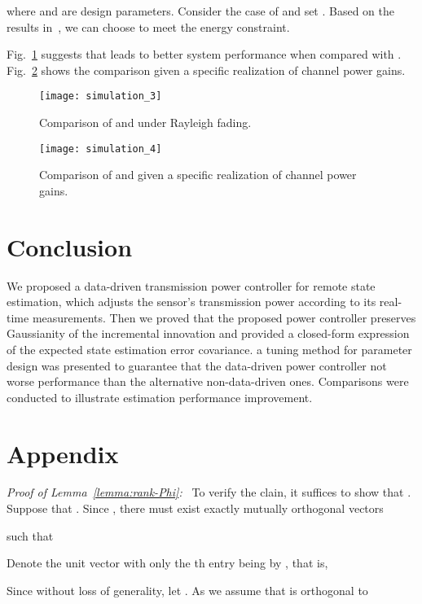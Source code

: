 \documentclass[twocolumn]{autart}    \usepackage{cite}
\begin{document}
{where  and  are design parameters.
Consider the case of  and set . Based on the results in~\cite{leong2012power}, we can choose  to meet the energy constraint.
{Fig.~\ref{fig:simulation_3} suggests that  leads
to better system performance when compared with . Fig.~\ref{fig:simulation_4}
shows the comparison given a specific realization of channel power gains.
\begin{figure}[thp]
  \centering
  \texttt{[image: simulation\_3]}
  \caption{Comparison of  and  under Rayleigh fading.} \label{fig:simulation_3}
  \vspace{-1mm}
\end{figure}
\begin{figure}[thp]
  \centering
  \texttt{[image: simulation\_4]}
  \caption{Comparison of  and  given a specific realization of channel power gains.} \label{fig:simulation_4}
  \vspace{-1mm}
\end{figure}

\section{Conclusion}\label{sec:conculsion}
We proposed a data-driven transmission power controller for remote state
estimation, which adjusts the sensor's transmission power according to
its real-time measurements. Then we proved that the proposed power
 controller preserves Gaussianity of the incremental innovation and provided a closed-form
expression of the expected state estimation error covariance.
a tuning method for parameter design was presented to guarantee
that the data-driven power controller
not worse performance than the
alternative non-data-driven ones.
Comparisons were conducted to illustrate estimation performance improvement.

\section*{Appendix}




\textit{Proof of Lemma~\ref{lemma:rank-Phi}:~}
To verify the clain, it
suffices to show that .
Suppose that . Since ,
there must exist exactly  mutually orthogonal vectors

such that

Denote the unit vector with
only the th
entry being  by
, that is,

Since
 without loss of generality, let
.
As we assume that  is orthogonal to

}}
\end{document}
